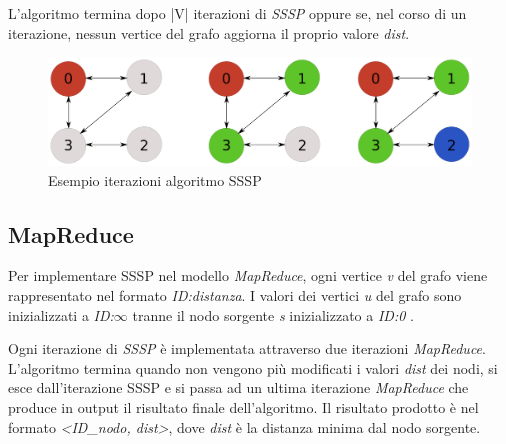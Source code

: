\documentclass[LaM,binding=0.6cm]{sapthesis}
\begin{document}
L'algoritmo termina dopo |V| iterazioni di \textit{SSSP} oppure se, nel corso di un iterazione, nessun vertice del grafo aggiorna il proprio valore \textit{dist}. 


\begin{figure}[hb]
\centering
\includegraphics[width=1\textwidth]{SSSP}
\caption{Esempio iterazioni algoritmo SSSP}
\label{fig:SSSP}
\end{figure}


\subsection{MapReduce}

Per implementare SSSP nel modello \textit{MapReduce}, ogni vertice \textit{v} del grafo viene rappresentato nel formato \textit{ID:distanza}. I valori dei vertici \textit{u} del grafo  sono inizializzati a \textit{ID:$\infty$} tranne il nodo sorgente \textit{s} inizializzato a \textit{ID:0 }.

Ogni iterazione di \textit{SSSP} è implementata attraverso due iterazioni \textit{MapReduce}. L'algoritmo termina quando non vengono più modificati i valori \textit{dist} dei nodi, si esce dall'iterazione SSSP e si passa ad un ultima iterazione \textit{MapReduce} che produce in output il risultato finale dell'algoritmo. Il risultato prodotto è nel formato \textit{<ID\_nodo, dist>}, dove \textit{dist} è la distanza minima dal nodo sorgente.
\end{document}
